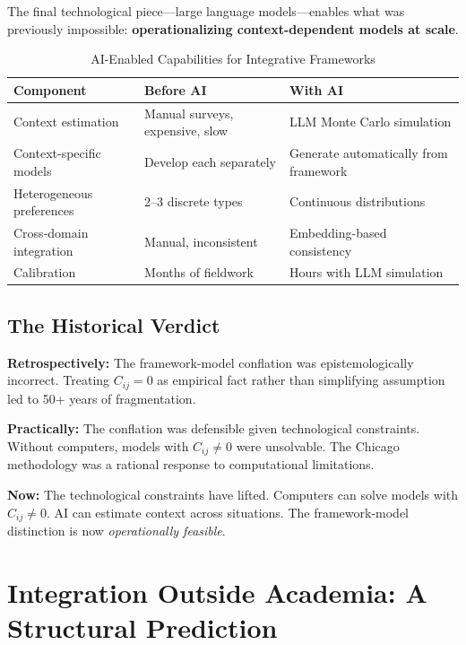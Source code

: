 \documentclass[12pt,a4paper]{article}
\begin{document}
The final technological piece---large language models---enables what was previously impossible: \textbf{operationalizing context-dependent models at scale}.

\begin{table}[H]
\centering
\caption{AI-Enabled Capabilities for Integrative Frameworks}
\label{tab:ai-enables}
\renewcommand{\arraystretch}{1.3}
\small
\begin{tabular}{@{}lp{4.5cm}p{4.5cm}@{}}
\toprule
\textbf{Component} & \textbf{Before AI} & \textbf{With AI} \\
\midrule
Context estimation & Manual surveys, expensive, slow & LLM Monte Carlo simulation \\
Context-specific models & Develop each separately & Generate automatically from framework \\
Heterogeneous preferences & 2--3 discrete types & Continuous distributions \\
Cross-domain integration & Manual, inconsistent & Embedding-based consistency \\
Calibration & Months of fieldwork & Hours with LLM simulation \\
\bottomrule
\end{tabular}
\end{table}

\subsection{The Historical Verdict}

\textbf{Retrospectively:} The framework-model conflation was epistemologically incorrect. Treating $C_{ij} = 0$ as empirical fact rather than simplifying assumption led to 50+ years of fragmentation.

\textbf{Practically:} The conflation was defensible given technological constraints. Without computers, models with $C_{ij} \neq 0$ were unsolvable. The Chicago methodology was a rational response to computational limitations.

\textbf{Now:} The technological constraints have lifted. Computers can solve models with $C_{ij} \neq 0$. AI can estimate context across situations. The framework-model distinction is now \textit{operationally feasible}.

\section{Integration Outside Academia: A Structural Prediction}
\label{sec:outside}
\end{document}
